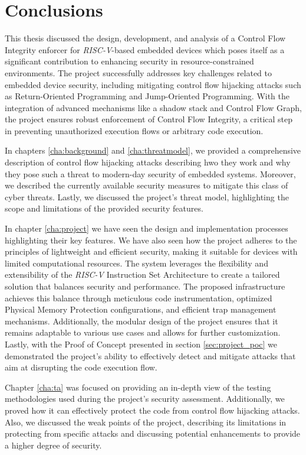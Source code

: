 \chapter{Conclusions}
\label{cha:conclusions}

This thesis discussed the design, development, and analysis of a Control Flow
Integrity enforcer for \textit{RISC-V}-based embedded devices which poses itself
as a significant contribution to enhancing security in resource-constrained environments.
The project successfully addresses key challenges related to embedded device
security, including mitigating control flow hijacking attacks such as Return-Oriented
Programming and Jump-Oriented Programming. With the integration of advanced
mechanisms like a shadow stack and Control Flow Graph, the project ensures robust
enforcement of Control Flow Integrity, a critical step in preventing
unauthorized execution flows or arbitrary code execution.

In chapters \ref{cha:background} and \ref{cha:threatmodel}, we provided a comprehensive
description of control flow hijacking attacks describing hwo they work and why they
pose such a threat to modern-day security of embedded systems. Moreover, we described
the currently available security measures to mitigate this class of cyber threats.
Lastly, we discussed the project's threat model, highlighting the scope and
limitations of the provided security features.

In chapter \ref{cha:project} we have seen the design and implementation
processes highlighting their key features. We have also seen how the project adheres
to the principles of lightweight and efficient security, making it suitable for
devices with limited computational resources. The system leverages the flexibility
and extensibility of the \textit{RISC-V} Instruction Set Architecture to create
a tailored solution that balances security and performance. The proposed infrastructure
achieves this balance through meticulous code instrumentation, optimized
Physical Memory Protection configurations, and efficient trap management mechanisms.
Additionally, the modular design of the project ensures that it remains adaptable
to various use cases and allows for further customization. Lastly, with the Proof
of Concept presented in section \ref{sec:project_poc} we demonstrated the project's
ability to effectively detect and mitigate attacks that aim at disrupting the code
execution flow.

Chapter \ref{cha:ta} was focused on providing an in-depth view of the testing methodologies
used during the project's security assessment. Additionally, we proved how it can
effectively protect the code from control flow hijacking attacks. Also, we discussed
the weak points of the project, describing its limitations in protecting from
specific attacks and discussing potential enhancements to provide a higher
degree of security.

